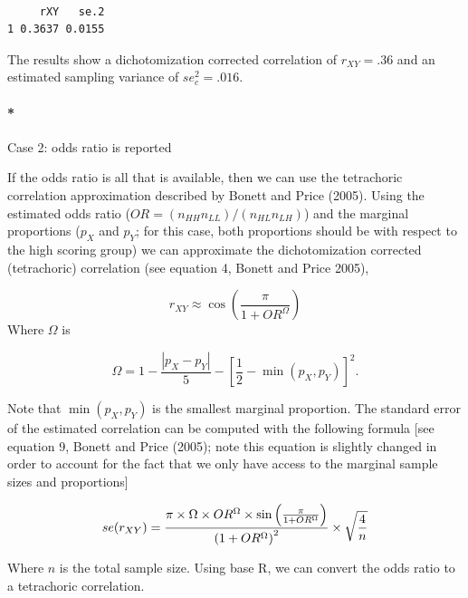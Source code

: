 \documentclass[
  letterpaper,
  DIV=11,
  numbers=noendperiod]{scrreprt}
\let\oldparagraph\paragraph
\renewcommand{\paragraph}[1]{\oldparagraph{#1}\mbox{}}
\begin{document}
\begin{verbatim}

     rXY   se.2 
1 0.3637 0.0155 
\end{verbatim}

The results show a dichotomization corrected correlation of
\(r_{XY} = .36\) and an estimated sampling variance of \(se_c^2=.016\).

\paragraph*{Case 2: odds ratio is
reported}\label{case-2-odds-ratio-is-reported}

If the odds ratio is all that is available, then we can use the
tetrachoric correlation approximation described by Bonett and Price
(2005). Using the estimated odds ratio
(\(OR=(n_{HH}n_{LL})/(n_{HL}n_{LH})\)) and the marginal proportions
(\(p_X\) and \(p_Y\); for this case, both proportions should be with
respect to the high scoring group) we can approximate the
dichotomization corrected (tetrachoric) correlation (see equation 4,
Bonett and Price 2005),

\[
r_{XY} \approx \cos\left( \frac{\pi}{1+OR^\Omega}\right)
\] Where \(\Omega\) is

\[
\Omega = 1 - \frac{\left|p_X -p_Y\right|}{5} - \left[\frac{1}{2}-\min(p_X,p_Y)\right]^2.
\]

Note that \(\min(p_X,p_Y)\) is the smallest marginal proportion. The
standard error of the estimated correlation can be computed with the
following formula {[}see equation 9, Bonett and Price (2005); note this
equation is slightly changed in order to account for the fact that we
only have access to the marginal sample sizes and proportions{]}

\[
\small{se(r_{XY}) =  \frac{\pi\times \Omega\times OR^\Omega\times\sin\left(\frac{\pi}{1+OR^\Omega}\right)}{\left(1+OR^\Omega\right)^2}\times\sqrt{\frac{4}{n}}}
\]

Where \(n\) is the total sample size. Using base R, we can convert the
odds ratio to a tetrachoric correlation.
\end{document}
